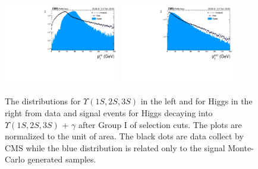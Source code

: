 \begin{figure}[!htbp]
\begin{center}
\includegraphics[width=0.45\textwidth]{figures_and_tables/outputPlots/HtoUpsilon_Cat0_ZZZZZ/au/data_x_mc/noKinCuts/h_noKin_Upsilon_Pt}\hspace*{1.cm}
\includegraphics[width=0.45\textwidth]{figures_and_tables/outputPlots/HtoUpsilon_Cat0_ZZZZZ/au/data_x_mc/noKinCuts/h_noKin_Z_Pt}
\end{center}\vspace*{-.5cm}
\caption{The \PT distributions for $\Upsilon(1S,2S,3S)$ in the left and for Higgs in the right from data and signal events for Higgs decaying into $\Upsilon(1S,2S,3S)$ + $\gamma$ after Group I of selection cuts. The plots are normalized to the unit of area. The black dots are data collect by CMS while the blue distribution is related only to the signal Monte-Carlo generated samples.}
\label{fig:pTUpsilon_and_Higgs_HtoUpsilon_Cat0}
\end{figure}


